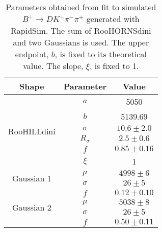 \begin{table}
  \centering
  \begin{tabular}{ccc}
      \toprule
      Shape & Parameter & Value \\
      \midrule
\multirow{6}{*}{RooHILLdini} & $a$ & 5050 \\
 & $b$ & 5139.69 \\
 & $\sigma$ & $10.6 \pm 2.0$ \\
 & $R_\sigma$ & $2.5 \pm 0.6$ \\
 & $f$ & $0.85 \pm 0.16$ \\
 & $\xi$ & 1 \\
      \midrule
\multirow{2}{*}{Gaussian 1} & $\mu$ & $4998 \pm 6$ \\
 & $\sigma$ & $26 \pm 5$ \\
 & $f$ & $0.12 \pm 0.10$ \\
      \midrule
\multirow{2}{*}{Gaussian 2} & $\mu$ & $5038 \pm 8$ \\
 & $\sigma$ & $26 \pm 5$ \\
 & $f$ & $0.50 \pm 0.11$ \\
      \bottomrule
  \end{tabular}
  \caption{Parameters obtained from fit to simulated $B^+ \to DK^+\pi^-\pi^+$ generated with RapidSim. The sum of RooHORNSdini and two Gaussians is used. The upper endpoint, $b$, is fixed to its theoretical value. The slope, $\xi$, is fixed to 1.}
\label{tab:DKpipi_parameters}
\end{table}
